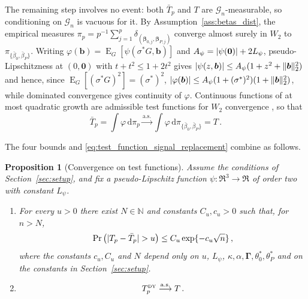 \documentclass{article}
\makeatletter
\DeclareMathOperator{\expect}{E}
\newtheorem{proposition}[theorem]{Proposition}
\theoremstyle{definition}
\newcommand{\vnorm}[1]{%
	\ensuremath{%
		\if@display
		\left\| #1 \right\|
		\else
		\| #1 \|
		\fi
	}%
}
\newcommand{\abs}[1]{%
	\ensuremath{%
		\if@display
		\left| #1 \right|
		\else
		\lvert #1 \rvert
		\fi
	}%
}
\newcommand*{\bb}{\boldsymbol}
\def\bbeta{\bb{\beta}}
\makeatother
\begin{document}
\begin{bibunit}

The remaining step involves no event: both $\bar T_p$ and $T$ are
$\mathcal G_n$-measurable, so conditioning on $\mathcal G_n$ is vacuous
for it. By
Assumption~\ref{ass:betas_dist}, the empirical measures
$\pi_p=p^{-1}\sum_{j=1}^p\delta_{(\bbeta_{0,j},\bbeta_{P,j})}$ converge
almost surely in $W_2$ to $\pi_{\{\bar\beta_0,\bar\beta_P\}}$. Writing
$\varphi(\bb b)=\expect_G[\psi(\sigma^*G,\bb b)]$ and
$A_\psi=\abs{\psi(\bb 0)}+2L_\psi$, pseudo-Lipschitzness at
$(0,\bb 0)$ with $t+t^2\leq1+2t^2$ gives
$\abs{\psi(z,\bb b)}\leq A_\psi(1+z^2+\vnorm{\bb b}_2^2)$ and hence,
since $\expect_G[(\sigma^*G)^2]=(\sigma^*)^2$,
$\abs{\varphi(\bb b)}\leq A_\psi(1+(\sigma^*)^2)(1+\vnorm{\bb b}_2^2)$,
while dominated convergence gives continuity of $\varphi$. Continuous functions of at
most quadratic growth are admissible test functions for $W_2$ 
convergence \citep[][Definition~6.8(iv) \& Theorem~6.9]{villani:2009}, so that 
\begin{equation}
\label{eq:test_function_signal_replacement}
    \bar T_p
    =
    \int\varphi\,\mathrm d\pi_p
    \overset{\mathrm{a.s.}}{\longrightarrow}
    \int\varphi\,\mathrm d\pi_{\{\bar\beta_0,\bar\beta_P\}}
    =
    T\,.
\end{equation}

The four bounds and \eqref{eq:test_function_signal_replacement} combine
as follows.
\begin{proposition}[Convergence on test functions]
\label{prop:test_function_convergence}
Assume the conditions of Section~\ref{sec:setup}, and fix a
pseudo-Lipschitz function $\psi:\Re^3\to\Re$ of order two with constant
$L_\psi$.

\begin{enumerate}[label=(\roman*)]
    \item For every $u>0$ there exist $N\in\mathbb N$ and constants $C_u,c_u>0$ such that, for
    $n > N$,
    $$
        \Pr
        \left(
            \abs{
                T_p-\bar T_p
            }
            >
            u
        \right)
        \leq
        C_u
        \exp\{-c_u\sqrt n\}\,,
    $$
    where the constants $c_u, C_u$ and $N$ depend only on $u$, $L_\psi$,
    $\kappa,\alpha,\bb\Gamma,\theta_0^*,\theta_P^*$
    and on the constants in Section~\ref{sec:setup}.
    \item
    $$
        T_p^{\textrm{\tiny DY}}
        \overset{\mathrm{a.s.}}{\longrightarrow}
        T\,.
    $$
\end{enumerate}


\end{proposition}
\end{bibunit}
\end{document}
